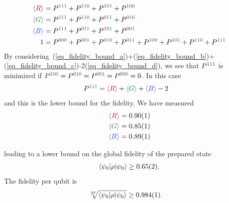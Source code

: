\documentclass[nofootinbib,pra,twocolumn,showpacs,superscriptaddress,notitlepage,amsmath]{revtex4-2} %
\begin{document}
\begin{subequations}
\label{eq_fidelity_bound_all}
\begin{align}
    \red{\braket{R}} &= P^{\red{1} \green{1} \blue{1}} + P^{\red{1} \green{1} \blue{0}} + P^{\red{1} \green{0} \blue{1}} + P^{\red{1} \green{0} \blue{0}} \label{eq_fidelity_bound_a} \\
    \green{\braket{G}} &= P^{\red{1} \green{1} \blue{1}} + P^{\red{1} \green{1} \blue{0}} + P^{\red{0} \green{1} \blue{1}} + P^{\red{0} \green{1} \blue{0}} \label{eq_fidelity_bound_b} \\
    \blue{\braket{B}} &= P^{\red{1} \green{1} \blue{1}} + P^{\red{0} \green{1} \blue{1}} + P^{\red{1} \green{0} \blue{1}} + P^{\red{0} \green{0} \blue{1}} \label{eq_fidelity_bound_c} \\
    1 &= P^{\red{0} \green{0} \blue{0}} + P^{\red{0} \green{0} \blue{1}} + P^{\red{0} \green{1} \blue{0}} + P^{\red{0} \green{1} \blue{1}} + P^{\red{1} \green{0} \blue{0}} + P^{\red{1} \green{0} \blue{1}} + P^{\red{1} \green{1} \blue{0}} + P^{\red{1} \green{1} \blue{1}}
    \label{eq_fidelity_bound_d} 
\end{align}
\end{subequations}
By considering~(\ref{eq_fidelity_bound_a})+(\ref{eq_fidelity_bound_b})+(\ref{eq_fidelity_bound_c})-2(\ref{eq_fidelity_bound_d}), we see that $P^{\red{1} \green{1} \blue{1}}$ is minimized if $P^{\red{1} \green{0} \blue{0}} = P^{\red{0} \green{1} \blue{0}} = P^{\red{0} \green{0} \blue{1}} = P^{\red{0} \green{0} \blue{0}} = 0$. In this case 
\begin{align}
P^{\red{1} \green{1} \blue{1}} &= \red{\braket{R}} + \green{\braket{G}} + \blue{\braket{B}} - 2
\end{align}
and this is the lower bound for the fidelity. We have measured
\begin{align}
\begin{split}
    \red{\braket{R}} &= 0.90(1) \\
    \green{\braket{G}} &= 0.85(1) \\
    \blue{\braket{B}} &= 0.89(1)
\end{split}
\end{align}



\noindent leading to a lower bound on the global fidelity of the prepared state
\begin{align}
    \braket{\psi_0 | \rho | \psi_0} \geq 0.65(2).
\end{align}
The fidelity per qubit is
\begin{align}
    \sqrt[27]{\braket{\psi_0 | \rho | \psi_0}} & \geq 0.984(1).
\end{align}
\end{document}
